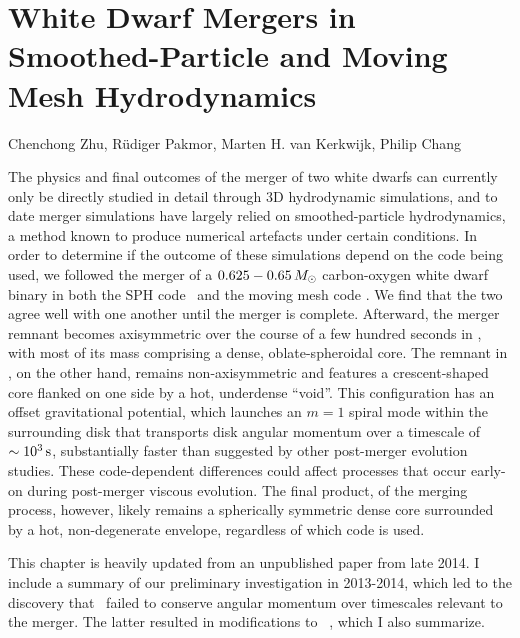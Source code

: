 \chapter{White Dwarf Mergers in Smoothed-Particle and Moving Mesh Hydrodynamics}
\label{ch:ch3}

\begin{center}
\begin{minipage}[c]{4.75in}
Chenchong Zhu, R\"{u}diger Pakmor, Marten H. van Kerkwijk, Philip Chang\\
\vspace{2em}
\end{minipage}
\end{center}

The physics and final outcomes of the merger of two white dwarfs can currently only be directly studied in detail through 3D hydrodynamic simulations, and to date merger simulations have largely relied on smoothed-particle hydrodynamics, a method known to produce numerical artefacts under certain conditions.  In order to determine if the outcome of these simulations depend on the code being used, we followed the merger of a $0.625 - 0.65\,\Msun$ carbon-oxygen white dwarf binary in both the SPH code \gasoline\ and the moving mesh code \arepo.  We find that the two agree well with one another until the merger is complete.  Afterward, the merger remnant becomes axisymmetric over the course of a few hundred seconds in \gasoline, with most of its mass comprising a dense, oblate-spheroidal core.  The remnant in \arepo, on the other hand, remains non-axisymmetric and features a crescent-shaped core flanked on one side by a hot, underdense ``void''.  This configuration has an offset gravitational potential, which launches an $m = 1$ spiral mode within the surrounding disk that transports disk angular momentum over a timescale of $\sim10^3\,\mathrm{s}$, substantially faster than suggested by other post-merger evolution studies.  These code-dependent differences could affect processes that occur early-on during post-merger viscous evolution.  The final product, of the merging process, however, likely remains a spherically symmetric dense core surrounded by a hot, non-degenerate envelope, regardless of which code is used.

This chapter is heavily updated from an unpublished paper from late 2014.  I include a summary of our preliminary investigation in 2013-2014, which led to the discovery that \arepo\ failed to conserve angular momentum over timescales relevant to the merger.  The latter resulted in modifications to \arepo\ \citep{pakm+16}, which I also summarize.


